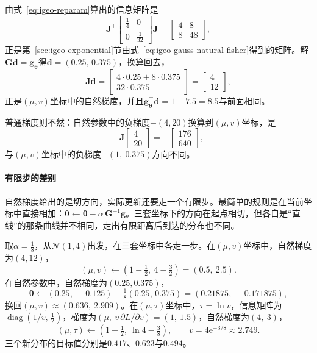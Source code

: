 由式~\eqref{eq:igeo-reparam}算出的信息矩阵是
\[
  \bm{J}^{\top}\begin{bmatrix}\frac14&0\\0&\frac1{32}\end{bmatrix}\bm{J}=\begin{bmatrix}4&8\\8&48\end{bmatrix},
\]
正是第~\ref{sec:igeo-exponential}节由式~\eqref{eq:igeo-gauss-natural-fisher}得到的矩阵。解$\bm{G}\bm{d}=\bm{g}_{\bm{\theta}}$得$\bm{d}=(0.25,\,0.375)$，换算回去，
\[
  \bm{J}\bm{d}=\begin{bmatrix}4\cdot0.25+8\cdot0.375\\32\cdot0.375\end{bmatrix}=\begin{bmatrix}4\\12\end{bmatrix},
\]
正是$(\mu,v)$坐标中的自然梯度，并且$\bm{g}_{\bm{\theta}}^{\top}\bm{d}=1+7.5=8.5$与前面相同。

普通梯度则不然：自然参数中的负梯度$-(4,20)$换算到$(\mu,v)$坐标，是
\[
  -\bm{J}\begin{bmatrix}4\\20\end{bmatrix}=-\begin{bmatrix}176\\640\end{bmatrix},
\]
与$(\mu,v)$坐标中的负梯度$-(1,\ 0.375)$方向不同。

\paragraph{有限步的差别}
自然梯度给出的是切方向，实际更新还要走一个有限步。最简单的规则是在当前坐标中直接相加：$\bm{\theta}\leftarrow\bm{\theta}-\alpha\,\bm{G}^{-1}\bm{g}$。三套坐标下的方向在起点相切，但各自是“直线”的那条曲线并不相同，走出有限距离后到达的分布也不同。

取$\alpha=\frac18$，从$\mathcal{N}(1,4)$出发，在三套坐标中各走一步。在$(\mu,v)$坐标中，自然梯度为$(4,12)$，
\[
  (\mu,v)\leftarrow(1-\tfrac12,\ 4-\tfrac32)=(0.5,\ 2.5).
\]
在自然参数中，自然梯度为$(0.25,0.375)$，
\[
  \bm{\theta}\leftarrow(0.25,\,-0.125)-\tfrac18(0.25,\,0.375)=(0.21875,\,-0.171875),
\]
换回$(\mu,v)\approx(0.636,\ 2.909)$。在$(\mu,\tau)$坐标中，$\tau=\ln v$，信息矩阵为$\operatorname{diag}(1/v,\,\frac12)$，梯度为$(\mu,\ v\,\partial L/\partial v)=(1,\ 1.5)$，自然梯度为$(4,\ 3)$，
\[
  (\mu,\tau)\leftarrow(1-\tfrac12,\ \ln4-\tfrac38),\qquad v=4\mathrm{e}^{-3/8}\approx2.749 .
\]
三个新分布的目标值分别是$0.417$、$0.623$与$0.494$。

